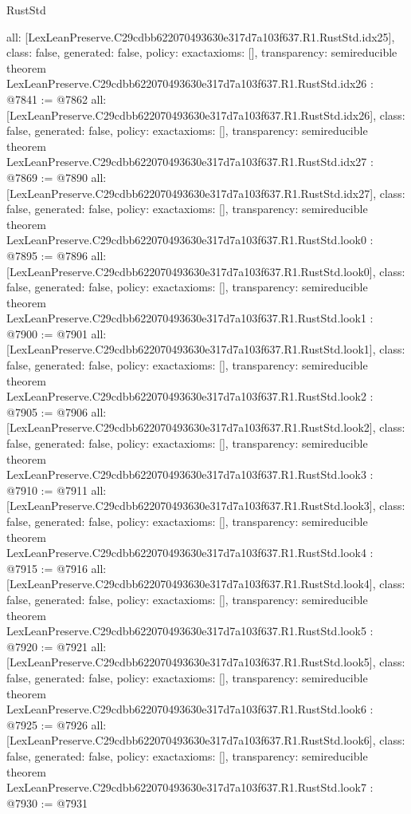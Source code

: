 \begin{lexlean}{RustStd}
\begin{coremodule}
{  all: [LexLeanPreserve.C29cdbb622070493630e317d7a103f637.R1.RustStd.idx25],
  class: false,
  generated: false,
  policy: exact{axioms: []},
  transparency: semireducible
}
theorem LexLeanPreserve.C29cdbb622070493630e317d7a103f637.R1.RustStd.idx26 : @7841 := @7862 {
  all: [LexLeanPreserve.C29cdbb622070493630e317d7a103f637.R1.RustStd.idx26],
  class: false,
  generated: false,
  policy: exact{axioms: []},
  transparency: semireducible
}
theorem LexLeanPreserve.C29cdbb622070493630e317d7a103f637.R1.RustStd.idx27 : @7869 := @7890 {
  all: [LexLeanPreserve.C29cdbb622070493630e317d7a103f637.R1.RustStd.idx27],
  class: false,
  generated: false,
  policy: exact{axioms: []},
  transparency: semireducible
}
theorem LexLeanPreserve.C29cdbb622070493630e317d7a103f637.R1.RustStd.look0 : @7895 := @7896 {
  all: [LexLeanPreserve.C29cdbb622070493630e317d7a103f637.R1.RustStd.look0],
  class: false,
  generated: false,
  policy: exact{axioms: []},
  transparency: semireducible
}
theorem LexLeanPreserve.C29cdbb622070493630e317d7a103f637.R1.RustStd.look1 : @7900 := @7901 {
  all: [LexLeanPreserve.C29cdbb622070493630e317d7a103f637.R1.RustStd.look1],
  class: false,
  generated: false,
  policy: exact{axioms: []},
  transparency: semireducible
}
theorem LexLeanPreserve.C29cdbb622070493630e317d7a103f637.R1.RustStd.look2 : @7905 := @7906 {
  all: [LexLeanPreserve.C29cdbb622070493630e317d7a103f637.R1.RustStd.look2],
  class: false,
  generated: false,
  policy: exact{axioms: []},
  transparency: semireducible
}
theorem LexLeanPreserve.C29cdbb622070493630e317d7a103f637.R1.RustStd.look3 : @7910 := @7911 {
  all: [LexLeanPreserve.C29cdbb622070493630e317d7a103f637.R1.RustStd.look3],
  class: false,
  generated: false,
  policy: exact{axioms: []},
  transparency: semireducible
}
theorem LexLeanPreserve.C29cdbb622070493630e317d7a103f637.R1.RustStd.look4 : @7915 := @7916 {
  all: [LexLeanPreserve.C29cdbb622070493630e317d7a103f637.R1.RustStd.look4],
  class: false,
  generated: false,
  policy: exact{axioms: []},
  transparency: semireducible
}
theorem LexLeanPreserve.C29cdbb622070493630e317d7a103f637.R1.RustStd.look5 : @7920 := @7921 {
  all: [LexLeanPreserve.C29cdbb622070493630e317d7a103f637.R1.RustStd.look5],
  class: false,
  generated: false,
  policy: exact{axioms: []},
  transparency: semireducible
}
theorem LexLeanPreserve.C29cdbb622070493630e317d7a103f637.R1.RustStd.look6 : @7925 := @7926 {
  all: [LexLeanPreserve.C29cdbb622070493630e317d7a103f637.R1.RustStd.look6],
  class: false,
  generated: false,
  policy: exact{axioms: []},
  transparency: semireducible
}
theorem LexLeanPreserve.C29cdbb622070493630e317d7a103f637.R1.RustStd.look7 : @7930 := @7931 {
}
\end{coremodule}
\end{lexlean}
